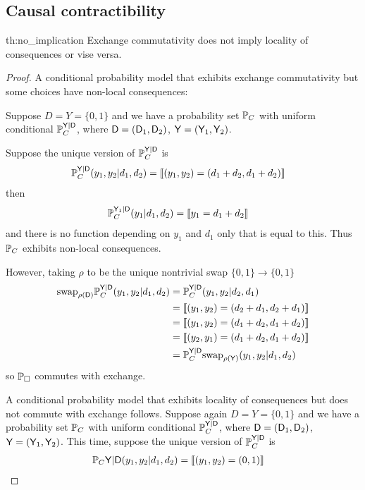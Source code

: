 \subsection{Causal contractibility}\label{sec:ccontract_appendix}

\begin{reptheorem}{th:no_implication}
Exchange commutativity does not imply locality of consequences or vise versa.
\end{reptheorem}

\begin{proof}
A conditional probability model that exhibits exchange commutativity but some choices have non-local consequences:

Suppose $D=Y=\{0,1\}$ and we have a probability set $\mathbb{P}_C$ with uniform conditional $\mathbb{P}_C^{\mathsf{Y}|\mathsf{D}}$, where $\mathsf{D}=(\mathsf{D}_1,\mathsf{D}_2)$, $\mathsf{Y}=(\mathsf{Y}_1,\mathsf{Y}_2)$.

Suppose the unique version of $\mathbb{P}_C^{\mathsf{Y}|\mathsf{D}}$ is
\begin{align}
    \mathbb{P}_C^{\mathsf{Y}|\mathsf{D}}(y_1,y_2|d_1,d_2) &= \llbracket (y_1,y_2)= (d_1+d_2,d_1+d_2) \rrbracket
\end{align}
then 
\begin{align}
    \mathbb{P}_C^{\mathsf{Y}_1|\mathsf{D}}(y_1|d_1,d_2) &= \llbracket y_1 = d_1+d_2 \rrbracket
\end{align}
and there is no function depending on $y_1$ and $d_1$ only that is equal to this. Thus $\mathbb{P}_C$ exhibits non-local consequences. 

However, taking $\rho$ to be the unique nontrivial swap $\{0,1\}\to \{0,1\}$
\begin{align}
    \text{swap}_{\rho(\mathsf{D})}\mathbb{P}_{C}^{\mathsf{Y}|\mathsf{D}}(y_1,y_2|d_1,d_2) &= \mathbb{P}_{C}^{\mathsf{Y}|\mathsf{D}}(y_1,y_2|d_2,d_1)\\
    &= \llbracket (y_1,y_2)= (d_2+d_1,d_2+d_1) \rrbracket\\
    &= \llbracket (y_1,y_2)= (d_1+d_2,d_1+d_2) \rrbracket\\
    &= \llbracket (y_2,y_1)= (d_1+d_2,d_1+d_2) \rrbracket\\
    &= \mathbb{P}_{C}^{\mathsf{Y}|\mathsf{D}}\text{swap}_{\rho(\mathsf{Y})}(y_1,y_2|d_1,d_2)
\end{align}
so $\mathbb{P}_\square$ commutes with exchange.

A conditional probability model that exhibits locality of consequences but does not commute with exchange follows. Suppose again $D=Y=\{0,1\}$ and we have a probability set $\mathbb{P}_C$ with uniform conditional $\mathbb{P}_C^{\mathsf{Y}|\mathsf{D}}$, where $\mathsf{D}=(\mathsf{D}_1,\mathsf{D}_2)$, $\mathsf{Y}=(\mathsf{Y}_1,\mathsf{Y}_2)$. This time, suppose the unique version of $\mathbb{P}_C^{\mathsf{Y}|\mathsf{D}}$ is
\begin{align}
    \mathbb{P}_C{\mathsf{Y}|\mathsf{D}}(y_1,y_2|d_1,d_2) &= \llbracket (y_1,y_2)= (0,1) \rrbracket
\end{align}


\end{proof}
